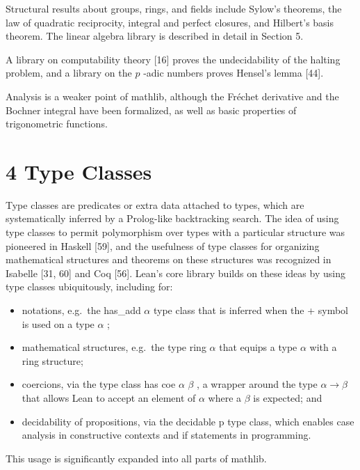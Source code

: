 \documentclass[
]{article}
\providecommand{\tightlist}{%
  \setlength{\itemsep}{0pt}\setlength{\parskip}{0pt}}
\begin{document}
Structural results about groups, rings, and fields include Sylow's
theorems, the law of quadratic reciprocity, integral and perfect
closures, and Hilbert's basis theorem. The linear algebra library is
described in detail in Section 5.

A library on computability theory {[}16{]} proves the undecidability of
the halting problem, and a library on the \(p\) -adic numbers proves
Hensel's lemma {[}44{]}.

Analysis is a weaker point of mathlib, although the Fréchet derivative
and the Bochner integral have been formalized, as well as basic
properties of trigonometric functions.

\section{4 Type Classes}\label{type-classes}

Type classes are predicates or extra data attached to types, which are
systematically inferred by a Prolog-like backtracking search. The idea
of using type classes to permit polymorphism over types with a
particular structure was pioneered in Haskell {[}59{]}, and the
usefulness of type classes for organizing mathematical structures and
theorems on these structures was recognized in Isabelle {[}31, 60{]} and
Coq {[}56{]}. Lean's core library builds on these ideas by using type
classes ubiquitously, including for:

\begin{itemize}
\tightlist
\item
  notations, e.g.~the has\_add \(\alpha\) type class that is inferred
  when the + symbol is used on a type \(\alpha\) ;\\
\item
  mathematical structures, e.g.~the type ring \(\alpha\) that equips a
  type \(\alpha\) with a ring structure;\\
\item
  coercions, via the type class has coe \(\alpha\) \(\beta\) , a wrapper
  around the type \(\alpha \to \beta\) that allows Lean to accept an
  element of \(\alpha\) where a \(\beta\) is expected; and\\
\item
  decidability of propositions, via the decidable p type class, which
  enables case analysis in constructive contexts and if statements in
  programming.
\end{itemize}

This usage is significantly expanded into all parts of mathlib.
\end{document}
